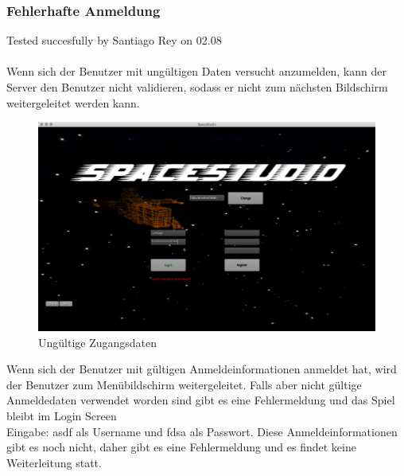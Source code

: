 \documentclass[12pt]{article}
\begin{document}
\subsubsection{Fehlerhafte Anmeldung}
Tested succesfully by Santiago Rey on 02.08\\\\
Wenn sich der Benutzer mit ungültigen Daten versucht anzumelden, kann der Server den Benutzer nicht validieren, sodass er nicht zum nächsten Bildschirm weitergeleitet werden kann.
\begin{figure}[h]
\centering
\includegraphics[scale=0.4]{TestProtocolBilder/invalidCredentials.jpg}
\caption{Ungültige Zugangsdaten}
\end{figure}
\newpage
Wenn sich der Benutzer mit gültigen Anmeldeinformationen anmeldet hat, wird der Benutzer zum Menübildschirm weitergeleitet. Falls aber nicht gültige Anmeldedaten verwendet worden sind gibt es eine Fehlermeldung und das Spiel bleibt im Login Screen\\
Eingabe: asdf als Username und fdsa als Passwort.
Diese Anmeldeinformationen gibt es noch nicht, daher gibt es eine Fehlermeldung und es findet keine Weiterleitung statt.\\
\end{document}
